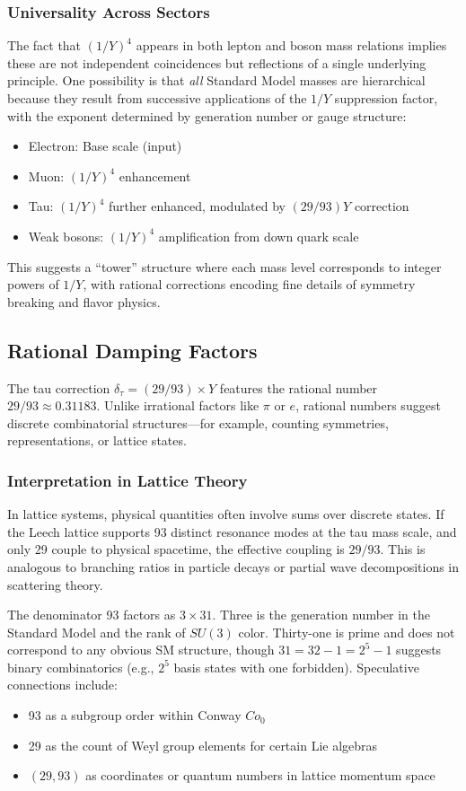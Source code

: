 \documentclass[11pt,a4paper]{article}
\begin{document}
\subsubsection{Universality Across Sectors}

The fact that $(1/Y)^4$ appears in both lepton and boson mass relations implies these are not independent coincidences but reflections of a single underlying principle. One possibility is that \emph{all} Standard Model masses are hierarchical because they result from successive applications of the $1/Y$ suppression factor, with the exponent determined by generation number or gauge structure:
\begin{itemize}
\item Electron: Base scale (input)
\item Muon: $(1/Y)^4$ enhancement
\item Tau: $(1/Y)^4$ further enhanced, modulated by $(29/93) Y$ correction
\item Weak bosons: $(1/Y)^4$ amplification from down quark scale
\end{itemize}

This suggests a ``tower'' structure where each mass level corresponds to integer powers of $1/Y$, with rational corrections encoding fine details of symmetry breaking and flavor physics.

\subsection{Rational Damping Factors}

The tau correction $\delta_\tau = (29/93) \times Y$ features the rational number $29/93 \approx 0.31183$. Unlike irrational factors like $\pi$ or $e$, rational numbers suggest discrete combinatorial structures—for example, counting symmetries, representations, or lattice states.

\subsubsection{Interpretation in Lattice Theory}

In lattice systems, physical quantities often involve sums over discrete states. If the Leech lattice supports 93 distinct resonance modes at the tau mass scale, and only 29 couple to physical spacetime, the effective coupling is $29/93$. This is analogous to branching ratios in particle decays or partial wave decompositions in scattering theory.

The denominator 93 factors as $3 \times 31$. Three is the generation number in the Standard Model and the rank of $SU(3)$ color. Thirty-one is prime and does not correspond to any obvious SM structure, though $31 = 32 - 1 = 2^5 - 1$ suggests binary combinatorics (e.g., $2^5$ basis states with one forbidden). Speculative connections include:
\begin{itemize}
\item 93 as a subgroup order within Conway $Co_0$
\item 29 as the count of Weyl group elements for certain Lie algebras
\item $(29, 93)$ as coordinates or quantum numbers in lattice momentum space
\end{itemize}
\end{document}
